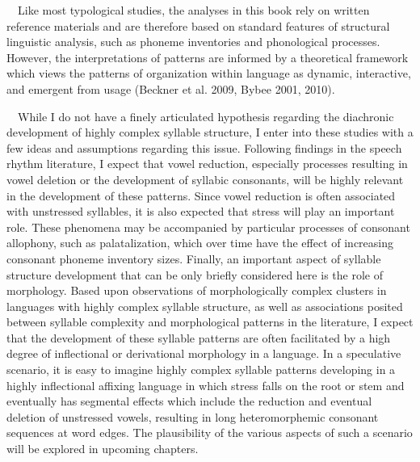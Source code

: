 \documentclass[12pt]{article}
\newenvironment{styleBody}{\renewcommand\baselinestretch{1.0}\setlength\leftskip{0in}\setlength\rightskip{0in plus 1fil}\setlength\parindent{0in}\setlength\parfillskip{0pt plus 1fil}\setlength\parskip{0in plus 1pt}\writerlistparindent\writerlistleftskip\leavevmode\normalfont\normalsize\fontsize{11pt}{13.2pt}\selectfont\mdseries\upshape\writerlistlabel\ignorespaces}{\unskip\vspace{0in plus 1pt}\par}
\newcommand\writerlistleftskip{}
\newcommand\writerlistparindent{}
\newcommand\writerlistlabel{}
\begin{document}
\begin{styleBody}
\ \ Like most typological studies, the analyses in this book rely on written reference materials and are therefore based on standard features of structural linguistic analysis, such as phoneme inventories and phonological processes. However, the interpretations of patterns are informed by a theoretical framework which views the patterns of organization within language as dynamic, interactive, and emergent from usage (Beckner et al. 2009, Bybee 2001, 2010).
\end{styleBody}

\begin{styleBody}
\ \ While I do not have a finely articulated hypothesis regarding the diachronic development of highly complex syllable structure, I enter into these studies with a few ideas and assumptions regarding this issue. Following findings in the speech rhythm literature, I expect that vowel reduction, especially processes resulting in vowel deletion or the development of syllabic consonants, will be highly relevant in the development of these patterns. Since vowel reduction is often associated with unstressed syllables, it is also expected that stress will play an important role. These phenomena may be accompanied by particular processes of consonant allophony, such as palatalization, which over time have the effect of increasing consonant phoneme inventory sizes. Finally, an important aspect of syllable structure development that can be only briefly considered here is the role of morphology. Based upon observations of morphologically complex clusters in languages with highly complex syllable structure, as well as associations posited between syllable complexity and morphological patterns in the literature, I expect that the development of these syllable patterns are often facilitated by a high degree of inflectional or derivational morphology in a language. In a speculative scenario, it is easy to imagine highly complex syllable patterns developing in a highly inflectional affixing language in which stress falls on the root or stem and eventually has segmental effects which include the reduction and eventual deletion of unstressed vowels, resulting in long heteromorphemic consonant sequences at word edges. The plausibility of the various aspects of such a scenario will be explored in upcoming chapters.
\end{styleBody}
\end{document}
